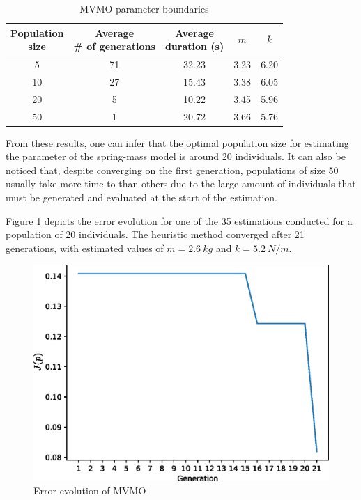 \begin{table}[!h]
	\centering
	\caption{MVMO parameter boundaries}
	\begin{tabular}{c|cccc}
		\shortstack{Population \\ size} & \shortstack{Average \\ \# of generations} & \shortstack{Average \\ duration (s)} & $\bar{m}$ & $\bar{k}$ \\
		\hline
		5 & 71 & 32.23 & 3.23 & 6.20 \\
		10 & 27 & 15.43 & 3.38 & 6.05 \\
		20 & 5 & 10.22 & 3.45 & 5.96 \\
		50 & 1 & 20.72 & 3.66 & 5.76 \\
	\end{tabular}
	\label{tab: spring_mass_MVMO_size}
\end{table}

From these results, one can infer that the optimal population size for estimating the parameter of the spring-mass model is around 20 individuals. It can also be noticed that, despite converging on the first generation, populations of size 50 usually take more time to than others due to the large amount of individuals that must be generated and evaluated at the start of the estimation.

Figure \ref{fig: MVMO_conv} depicts the error evolution for one of the 35 estimations conducted for a population of 20 individuals. The heuristic method converged after 21 generations, with estimated values of $m=2.6\ kg$ and $k=5.2\ N/m$.

\begin{figure}[h]
	\caption{Error evolution of MVMO}
	\begin{center}
		\includegraphics[scale=0.6]{Images/MVMO_conv.eps}
	\end{center}
	\label{fig: MVMO_conv}
\end{figure}

